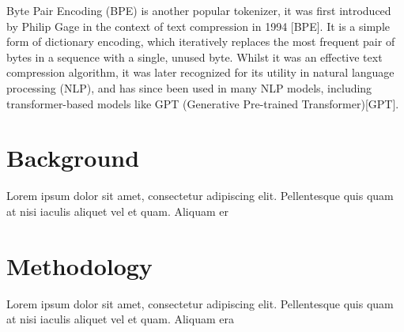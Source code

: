 \documentclass{UoYCSproject}
\begin{document}
Byte Pair Encoding (BPE) is another popular tokenizer, it was first introduced by Philip Gage in the context of text compression in 1994 [BPE].
It is a simple form of dictionary encoding, which iteratively replaces the most frequent pair of bytes in a sequence with a single, unused byte.
Whilst it was an effective text compression algorithm, it was later recognized for its utility in natural language processing (NLP),
and has since been used in many NLP models, including transformer-based models like GPT (Generative Pre-trained Transformer)[GPT].


\chapter{Background}
\label{ch:background}
Lorem ipsum dolor sit amet, consectetur adipiscing elit. Pellentesque
quis quam at nisi iaculis aliquet vel et quam. Aliquam er

\chapter{Methodology}
\label{ch:methodology}
Lorem ipsum dolor sit amet, consectetur adipiscing elit. Pellentesque
quis quam at nisi iaculis aliquet vel et quam. Aliquam era

\printbibliography
\end{document}
